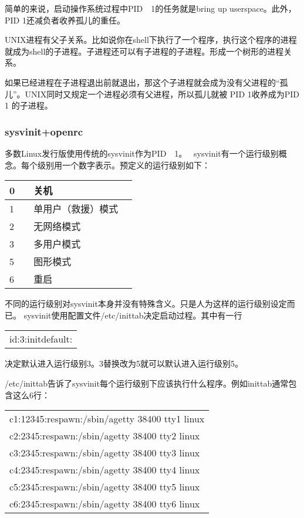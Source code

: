 \documentclass[amstex,twoside]{ctexbook}
\newenvironment{insertnote}{ \ttfamily\CJKfamily{KaiTi} }{\vskip 0.5cm }
\newenvironment{code}{\small\tt\begin{longtable}{p{0.8\textwidth}}}{\end{longtable}}
\begin{document}
简单的来说，启动操作系统过程中PID　1的任务就是bring up userspace。此外，PID 1还减负者收养孤儿的重任。

\begin{insertnote}
UNIX进程有父子关系。比如说你在shell下执行了一个程序，执行这个程序的进程就成为shell的子进程。子进程还可以有子进程的子进程。形成一个树形的进程关系。
\end{insertnote}

如果已经进程在子进程退出前就退出，那这个子进程就会成为没有父进程的“孤儿”。UNIX同时又规定一个进程必须有父进程，所以孤儿就被 PID 1收养成为PID 1 的子进程。


\subsubsection{sysvinit+openrc}

多数Linux发行版使用传统的sysvinit作为PID　1。　
sysvinit有一个运行级别概念。每个级别用一个数字表示。预定义的运行级别如下：

\begin{longtable}{|l|p{}|}\hline
0　& 关机\\\hline
1 & 单用户（救援）模式　\\\hline
2 & 无网络模式　\\\hline
3 & 多用户模式　\\\hline
5 & 图形模式　\\\hline
6 & 重启　\\\hline
\end{longtable}

不同的运行级别对sysvinit本身并没有特殊含义。只是人为这样的运行级别设定而已。
sysvinit使用配置文件/etc/inittab决定启动过程。其中有一行
\begin{code}
id:3:initdefault:
\end{code}
决定默认进入运行级别3。3替换改为5就可以默认进入运行级别5。

/etc/inittab告诉了sysvinit每个运行级别下应该执行什么程序。例如inittab通常包含这么6行：
\begin{code}
c1:12345:respawn:/sbin/agetty 38400 tty1 linux\\
c2:2345:respawn:/sbin/agetty 38400 tty2 linux\\
c3:2345:respawn:/sbin/agetty 38400 tty3 linux\\
c4:2345:respawn:/sbin/agetty 38400 tty4 linux\\
c5:2345:respawn:/sbin/agetty 38400 tty5 linux\\
c6:2345:respawn:/sbin/agetty 38400 tty6 linux
\end{code}
\end{document}
